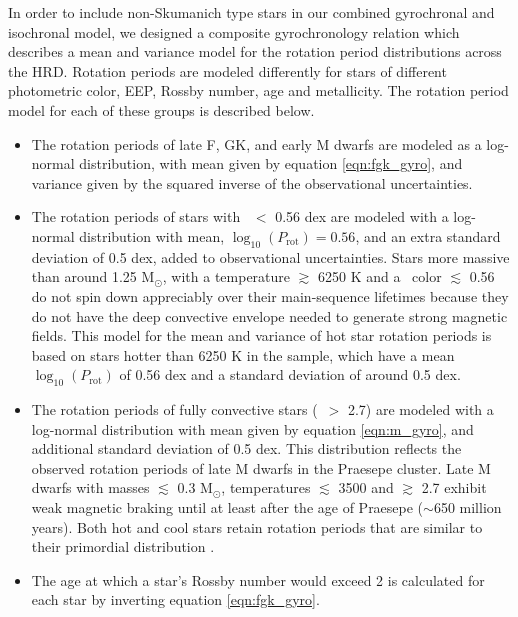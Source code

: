 {In order to include non-Skumanich type stars in our combined gyrochronal and
isochronal model, we designed a composite gyrochronology relation which
describes a mean and variance model for the rotation period distributions
across the HRD.
Rotation periods are modeled differently for stars of different photometric
color, EEP, Rossby number, age and metallicity.
The rotation period model for each of these groups is described below.
\begin{itemize}
    \item{The rotation periods of late F, GK, and early M dwarfs are modeled
        as a log-normal distribution, with mean given by equation
        \ref{eqn:fgk_gyro}, and variance given by the squared inverse of the
        observational uncertainties.}
    \item{The rotation periods of stars with \gcolor\ $<$ 0.56 dex are modeled
        with a log-normal distribution with mean,
        $\log_{10}(P_\mathrm{rot})=0.56$, and an extra standard deviation of
        0.5 dex, added to observational uncertainties.
        Stars more massive than around 1.25 M$_\odot$, with a temperature
        $\gtrsim$ 6250 K and a \gcolor\ color $\lesssim$ 0.56 do not spin down
        appreciably over their main-sequence lifetimes because they do not
        have the deep convective envelope needed to generate strong magnetic
        fields.
        This model for the mean and variance of hot star rotation periods is
        based on stars hotter than 6250 K in the \citet{mcquillan2014} sample,
        which have a mean $\log_{10}(P_\mathrm{rot})$ of 0.56 dex and a
        standard deviation of around 0.5 dex.}
    \item{The rotation periods of fully convective stars (\gcolor\ $>$ 2.7)
        are modeled with a log-normal distribution with mean given by equation
        \ref{eqn:m_gyro}, and additional standard deviation of 0.5 dex.
        This distribution reflects the observed rotation periods  of late M
        dwarfs in the Praesepe cluster.
        Late M dwarfs with masses $\lesssim$ 0.3 M$_\odot$, temperatures
        $\lesssim$ 3500 and \gcolor $\gtrsim$ 2.7 exhibit weak magnetic
        braking until at least after the age of Praesepe ($\sim$650 million
        years).
        Both hot and cool stars retain rotation periods that are similar to
        their primordial distribution \citep[see \eg][]{matt2012,
        somers2017}.}
    \item{The age at which a star's Rossby number would exceed 2 is calculated
        for each star by inverting equation \ref{eqn:fgk_gyro}.
}
\end{itemize}}
